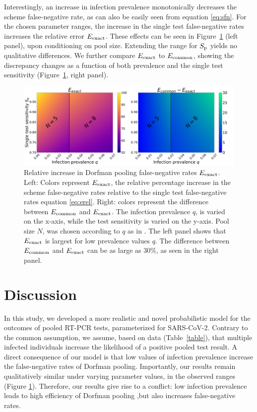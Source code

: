\documentclass{article}
\begin{document}
Interestingly, an increase in infection prevalence monotonically
decreases the scheme false-negative rate, as can also be easily seen
from equation \eqref{eq:sfn}. For the chosen parameter ranges, the increase in
the single test false-negative rates increases the relative error
$E_{\text{{exact}}}$. These effects can be seen in Figure~\ref{fig1} (left
panel), upon conditioning on pool size. Extending the range for $S_\text{p}$
yields no qualitative differences. We further compare $E_{\text{{exact}}}$ to
$E_{\text{{common}}}$, showing the discrepancy changes as a function of both
prevalence and the single test sensitivity (Figure~\ref{fig1}, right
panel).
\begin{figure}[H]
  \centering
  \includegraphics[width=\textwidth]{heatmap_sfn.jpg}
  \caption{Relative increase in Dorfman pooling false-negative rates
    $E_{\text{{exact}}}$. Left: Colors represent $E_{\text{{exact}}}$, the relative
    percentage increase in the scheme false-negative rates relative to
    the single test false-negative rates equation \eqref{eq:erel}. Right:
    colors represent the difference between $E_{\text{{common}}}$ and
    $E_{\text{{exact}}}$. The infection prevalence $q$, is varied on the
    x-axis, while the test sensitivity is varied on the y-axis. Pool
    size $N$, was chosen according to $q$ as in
    \cite{DorfmanYuvalDor}. The left panel shows that $E_{\text{{exact}}}$ is
    largest for low prevalence values $q$. The difference between
    $E_{\text{{common}}}$ and $E_{\text{{exact}}}$ can be as large as 30\%, as seen
    in the right panel. }\label{fig1}
\end{figure}

\section*{Discussion}
In this study, we developed a more realistic and novel probabilistic
model for the outcomes of pooled RT-PCR tests, parameterized for
SARS-CoV-2. Contrary to the common assumption, we assume, based on
data (Table~\ref{table}), that multiple infected individuals increase
the likelihood of a positive pooled test result. A direct consequence
of our model is that low values of infection prevalence increase the
false-negative rates of Dorfman pooling. Importantly, our results
remain qualitatively similar under varying parameter values, in the
observed ranges \cite{KitComparison,EstimatingRatesKucrika,
  EstimatingRatesLourenco, InterpretingCOVID19Test} (Figure
\ref{fig1}). Therefore, our results give rise to a conflict: low
infection prevalence leads to high efficiency of Dorfman pooling
\cite{DorfmanYuvalDor},but also increases false-negative rates.
\end{document}
